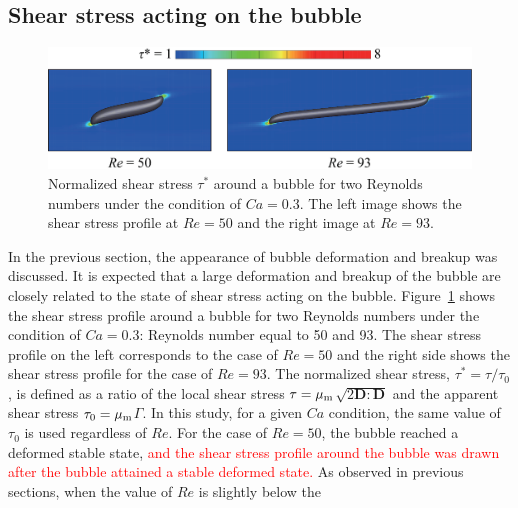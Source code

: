 \documentclass{elsarticle}
\newcommand{\vv}{\mathbf}
\newcommand{\bmD}{\vv{D}}
\begin{document}

\subsection{Shear stress acting on the bubble}
%
\begin{figure}%
  \centering
  \includegraphics[scale=0.4]{Figure/8-ShearStress}
  \caption{Normalized shear stress $\tau^{\ast}$ around a bubble for 
	two Reynolds 
        numbers under the condition of $Ca = 0.3$. The left image shows the 
        shear stress profile at $Re=50$ and the right image at $Re=93$.
   }
  \label{fig:ShearStress}
\end{figure}
%
In the previous section, the appearance of bubble deformation and breakup was
discussed. It is expected that a large deformation and breakup of the bubble
are closely related to the state of shear stress acting on the bubble.
Figure~\ref{fig:ShearStress} shows the shear stress profile around a bubble for
two Reynolds numbers under the condition of $Ca = 0.3$: Reynolds number equal
to 50 and 93.  The shear stress profile on the left corresponds to the case of
$Re = 50$ and the right side shows the shear stress profile for the case of $Re
= 93$.  The normalized shear stress, $\tau^{\ast} = \tau / \tau_{0}$, is
defined as a ratio of the local shear stress $\tau = \mu_{\rm
m}$$\sqrt{2\bmD:\bmD}$ and the apparent shear stress $\tau_{0} = \mu_{\rm
m}$$\mathit{\Gamma}$.  In this study, for a given $Ca$ condition, the same
value of $\tau_{0}$ is used regardless of $Re$. 
For the case of $Re = 50$, the bubble reached a deformed stable state,
\textcolor{red}
{
and the shear stress profile around the bubble was drawn after the bubble attained a stable deformed state.
}
As observed in previous sections, when the value of $Re$ is slightly below the 
\end{document}
